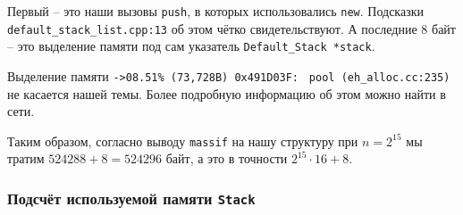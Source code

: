 Первый -- это наши вызовы \texttt{push}, в которых использовались \texttt{new}. Подсказки \texttt{default_stack_list.cpp:13} об этом чётко свидетельствуют. А последние \(8\) байт -- это выделение памяти под сам указатель \texttt{Default_Stack *stack}.

\begin{mdframed}[style=mdfStyleCode]%
  \begin{remark}\rm%
  Выделение памяти \texttt{->08.51\% (73,728B) 0x491D03F:} \texttt{ pool (eh_alloc.cc:235)} не касается нашей темы. Более подробную информацию об этом можно найти в сети.
\end{remark}
\end{mdframed}

Таким образом, согласно выводу \texttt{massif} на нашу структуру при \(n = 2^{15}\) мы тратим \(524288 + 8 = 524296\) байт, а это в точности \(2^{15} \cdot 16 + 8\).

\subsubsection{Подсчёт используемой памяти \texttt{Stack}}

